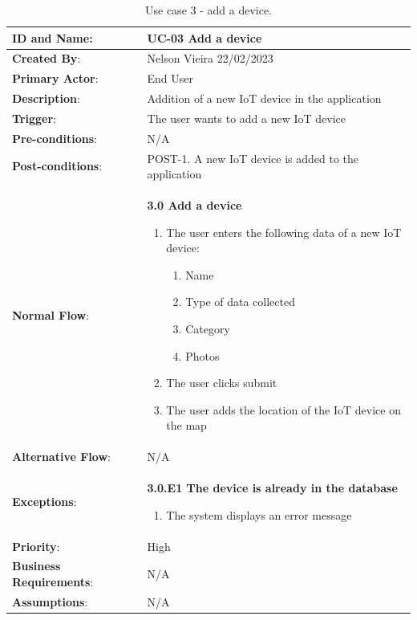 \begin{table}[H]
    \centering
    \begin{adjustbox}{width=1.15\textwidth,center=\textwidth}
        \begin{tabular}{|m{4cm}|m{12cm}|}
            \hline
            \textbf{ID and Name}: & UC-03 Add a device \\
            \hline
            \textbf{Created By}: & Nelson Vieira 22/02/2023 \\
            \hline
            \textbf{Primary Actor}: & End User \\
            \hline
            \textbf{Description}: & Addition of a new IoT device in the application \\
            \hline
            \textbf{Trigger}: & The user wants to add a new IoT device \\
            \hline
            \textbf{Pre-conditions}: & N/A \\
            \hline
            \textbf{Post-conditions}: & POST-1. A new IoT device is added to the application \\
            \hline
            \textbf{Normal Flow}: & \textbf{3.0 Add a device}
            \begin{enumerate}
                \item The user enters the following data of a new IoT device:
                \begin{enumerate}
                    \item Name
                    \item Type of data collected
                    \item Category
                    \item Photos
                \end{enumerate}
                \item The user clicks submit
                \item The user adds the location of the IoT device on the map
            \end{enumerate} \\
            \hline
            \textbf{Alternative Flow}: & N/A \\
            \hline
            \textbf{Exceptions}: & \textbf{3.0.E1  The device is already in the database}
            \begin{enumerate}
                \item The system displays an error message
            \end{enumerate} \\
            \hline
            \textbf{Priority}: & High \\
            \hline
            \textbf{Business Requirements}: & N/A \\
            \hline
            \textbf{Assumptions}: & N/A \\
            \hline
        \end{tabular}
    \end{adjustbox}
    \vspace{1em}
    \caption{Use case 3 - add a device.}
    \label{table:use_case3}
\end{table}

